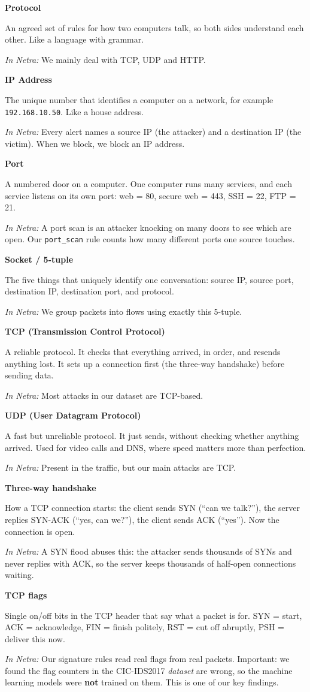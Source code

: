 \documentclass[11pt,a4paper]{article}
\newcommand{\term}[3]{%
  \par\medskip\noindent\textbf{\color{ink}#1}\par
  \nobreak\vspace{1pt}#2\par
  \nobreak\vspace{1pt}\textit{\color{accent}In Netra:} #3\par}
\begin{document}
\term{Protocol}
{An agreed set of rules for how two computers talk, so both sides understand each
other. Like a language with grammar.}
{We mainly deal with TCP, UDP and HTTP.}

\term{IP Address}
{The unique number that identifies a computer on a network, for example
\texttt{192.168.10.50}. Like a house address.}
{Every alert names a source IP (the attacker) and a destination IP (the victim).
When we block, we block an IP address.}

\term{Port}
{A numbered door on a computer. One computer runs many services, and each service
listens on its own port: web = 80, secure web = 443, SSH = 22, FTP = 21.}
{A port scan is an attacker knocking on many doors to see which are open. Our
\texttt{port\_scan} rule counts how many different ports one source touches.}

\term{Socket / 5-tuple}
{The five things that uniquely identify one conversation: source IP, source port,
destination IP, destination port, and protocol.}
{We group packets into flows using exactly this 5-tuple.}

\term{TCP (Transmission Control Protocol)}
{A reliable protocol. It checks that everything arrived, in order, and resends
anything lost. It sets up a connection first (the three-way handshake) before
sending data.}
{Most attacks in our dataset are TCP-based.}

\term{UDP (User Datagram Protocol)}
{A fast but unreliable protocol. It just sends, without checking whether anything
arrived. Used for video calls and DNS, where speed matters more than perfection.}
{Present in the traffic, but our main attacks are TCP.}

\term{Three-way handshake}
{How a TCP connection starts: the client sends SYN (``can we talk?''), the server
replies SYN-ACK (``yes, can we?''), the client sends ACK (``yes''). Now the
connection is open.}
{A SYN flood abuses this: the attacker sends thousands of SYNs and never replies
with ACK, so the server keeps thousands of half-open connections waiting.}

\term{TCP flags}
{Single on/off bits in the TCP header that say what a packet is for.
SYN = start, ACK = acknowledge, FIN = finish politely, RST = cut off abruptly,
PSH = deliver this now.}
{Our signature rules read real flags from real packets. Important: we found the
flag counters in the CIC-IDS2017 \emph{dataset} are wrong, so the machine learning
models were \textbf{not} trained on them. This is one of our key findings.}
\end{document}
